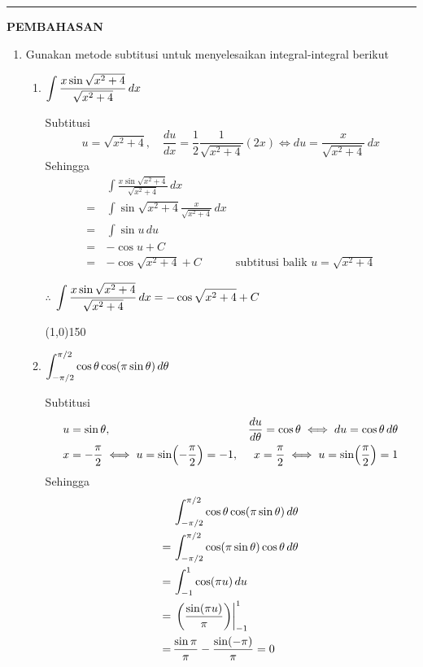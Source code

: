 \vspace{0.2cm}\hrule height 1pt\vspace{0.5cm}


\begin{center}
\textbf{\large{PEMBAHASAN}}
\end{center}
\begin{enumerate}[leftmargin=*, label={\arabic*}.]
\item Gunakan metode subtitusi untuk menyelesaikan integral-integral berikut
    \begin{enumerate}[label={\alph*}.]
    \item $\displaystyle\int \frac{x\sin\sqrt{x^{2}+4}}{\sqrt{x^{2}+4}}\, dx$
    
    Subtitusi
    \[
        u = \sqrt{x^{2}+4},\quad\frac{du}{dx} = \frac{1}{2}\frac{1}{\sqrt{x^{2}+4}}(2x) 
        \iff du = \frac{x}{\sqrt{x^{2}+4}}\,dx
    \]
    Sehingga 
    \begin{align*}
        &\int \frac{x\sin\sqrt{x^{2}+4}}{\sqrt{x^{2}+4}}\, dx \\
        =\,& \int \sin\sqrt{x^{2}+4}\frac{x}{\sqrt{x^{2}+4}}\, dx\\
        =\,& \int \sin u\, du\\
        =\,&-\cos u + C\\
        =\,&-\cos\sqrt{x^{2}+4} + C &\text{subtitusi balik }u = \sqrt{x^{2}+4}
    \end{align*}

    $\therefore$ 
    $\displaystyle\int \frac{x\sin\sqrt{x^{2}+4}}{\sqrt{x^{2}+4}}\, dx = -\cos\sqrt{x^{2}+4} + C$


\begin{center}\line(1,0){150}\end{center}


    \item $\ds\int_{-\pi/2}^{\pi/2} \cos\theta\cos\brk*{\pi\sin\theta}\,d\theta$
    
    Subtitusi
    \begin{align*}
        &u = \sin\theta,&\frac{du}{d\theta} = \cos\theta \iff du = \cos\theta\,d\theta\\
        &x=-\frac{\pi}{2} \iff u = \sin\brk*{-\frac{\pi}{2}} = -1,
        &x=\frac{\pi}{2} \iff u = \sin \brk*{\frac{\pi}{2}} = 1
    \end{align*}
    Sehingga 
    \begin{align*}
        &\int_{-\pi/2}^{\pi/2} \cos\theta\cos\brk*{\pi\sin\theta}\,d\theta\\
        =\,& \int_{-\pi/2}^{\pi/2} \cos\brk*{\pi\sin\theta}\cos\theta\,d\theta\\
        =\,& \int_{-1}^{1} \cos(\pi u)\, du\\
        =\,& \eval{\frac{\sin(\pi u)}{\pi}}{-1}{1}\\
        =\,& \frac{\sin\pi}{\pi}-\frac{\sin(-\pi)}{\pi} = 0
    \end{align*}


\end{enumerate}
\end{enumerate}
